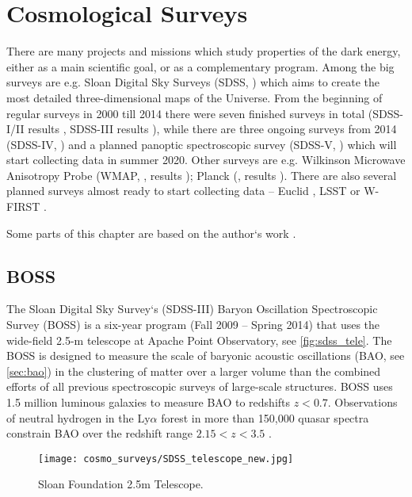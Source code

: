 \chapter{Cosmological Surveys}

There are many projects and missions which study properties of the dark energy, either as a main scientific goal, or as a complementary program. Among the big surveys are e.g. Sloan Digital Sky Surveys (SDSS, \cite{SDSS}) which aims to create the most detailed three-dimensional maps of the Universe. From the beginning of regular surveys in 2000 till 2014 there were seven finished surveys in total (SDSS-I/II results \cite{SDSS_I_II}, SDSS-III results \cite{BOSS_results}), while there are three ongoing surveys from 2014 (SDSS-IV, \cite{2017AJ....154...28B}) and a planned panoptic spectroscopic survey (SDSS-V, \cite{2017arXiv171103234K}) which will start collecting data in summer 2020. Other surveys are e.g. Wilkinson Microwave Anisotropy Probe (WMAP, \cite{WMAP}, results \cite{WMAP_results}); Planck (\cite{planck}, results \cite{planck_cosm}). There are also several planned surveys almost ready to start collecting data -- Euclid \parencite{euclid}, LSST \parencite{lsst} or W-FIRST \parencite{WFIRST_report}.

Some parts of this chapter are based on the author`s work \textcite{mastersthesis_vrastil}.
\section{BOSS}
The Sloan Digital Sky Survey`s (SDSS-III) Baryon Oscillation Spectroscopic Survey (BOSS) is a six-year program (Fall 2009 -- Spring 2014)  that uses the wide-field 2.5-m telescope at Apache Point Observatory, see \autoref{fig:sdss_tele}. The BOSS is designed to measure the scale of baryonic acoustic oscillations (BAO, see \autoref{sec:bao}) in the clustering of matter over a larger volume than the combined efforts of all previous spectroscopic surveys of large-scale structures. BOSS uses 1.5 million luminous galaxies to measure BAO to redshifts $z<0.7$. Observations of neutral hydrogen in the Ly$\alpha$ forest in more than 150,000 quasar spectra constrain BAO over the redshift range $2.15 < z < 3.5$ \cite{BOSS}.
\begin{figure}[ht]
    \centering
    \texttt{[image: cosmo\_surveys/SDSS\_telescope\_new.jpg]}
    \caption{Sloan Foundation 2.5m Telescope.}
    \label{fig:sdss_tele}
\end{figure}


